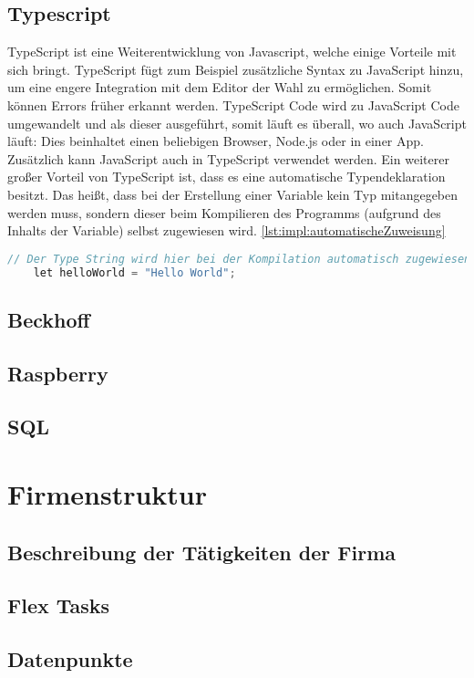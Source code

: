 \subsection{Typescript}
TypeScript ist eine Weiterentwicklung von Javascript, welche einige Vorteile mit sich bringt. TypeScript fügt zum Beispiel zusätzliche Syntax zu JavaScript hinzu, um eine engere Integration mit dem Editor der Wahl zu ermöglichen. Somit können Errors früher erkannt werden. TypeScript Code wird zu JavaScript Code umgewandelt und als dieser ausgeführt, somit läuft es überall, wo auch JavaScript läuft: Dies beinhaltet einen beliebigen Browser, Node.js oder in einer App. Zusätzlich kann JavaScript auch in TypeScript verwendet werden. Ein weiterer großer Vorteil von TypeScript ist, dass es eine automatische Typendeklaration besitzt. Das heißt, dass bei der Erstellung einer Variable kein Typ mitangegeben werden muss, sondern dieser beim Kompilieren des Programms (aufgrund des Inhalts der Variable) selbst zugewiesen wird. \ref{lst:impl:automatischeZuweisung}
 
\begin{lstlisting}[language=java,caption=TypeScript automatische Zuweisung,label=lst:impl:automatischeZuweisung]
    // Der Type String wird hier bei der Kompilation automatisch zugewiesen
    let helloWorld = "Hello World";
\end{lstlisting}
 
\subsection{Beckhoff}
\subsection{Raspberry}
 
\subsection{SQL}
 
\section{Firmenstruktur}
 
 
\subsection{Beschreibung der Tätigkeiten der Firma}
\subsection{Flex Tasks}
\subsection{Datenpunkte}
